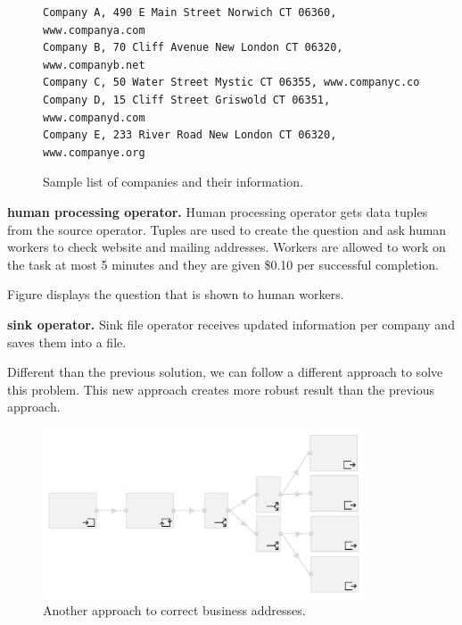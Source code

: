 \begin{figure}[ht]
	\centering
\begin{lstlisting}
Company A, 490 E Main Street Norwich CT 06360, www.companya.com
Company B, 70 Cliff Avenue New London CT 06320, www.companyb.net
Company C, 50 Water Street Mystic CT 06355, www.companyc.co
Company D, 15 Cliff Street Griswold CT 06351, www.companyd.com
Company E, 233 River Road New London CT 06320, www.companye.org
\end{lstlisting}
\caption{Sample list of companies and their information.}
	\label{fig:scenario1.list}
\end{figure}


\textbf{human processing operator.}
Human processing operator gets data tuples from the source operator. Tuples are used to create the question and ask human workers to check website and mailing addresses. Workers are allowed to work on the task at most 5 minutes and they are given \$0.10 per successful completion.

Figure displays the question that is shown to human workers.


\textbf{sink operator.}
Sink file operator receives updated information per company and saves them into a file.



Different than the previous solution, we can follow a different approach to solve this problem. This new approach creates more robust result than the previous approach.

\begin{figure}[ht]
	\centering
	\includegraphics[width=0.85\textwidth]{figures/scenarios/scenario1_2.png}
	\caption{Another approach to correct business addresses.}
	\label{fig:scenario1.2}
\end{figure}

